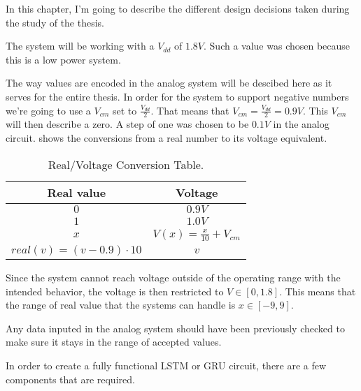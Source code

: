 
\label{cap:design}

In this chapter, I'm going to describe the different design decisions taken during the study of the thesis.

The system will be working with a $V_{dd}$ of $1.8V$. Such a value was chosen because this is a low power system.

The way values are encoded in the analog system will be descibed here as it serves for the entire thesis.
In order for the system to support negative numbers we're going to use a $V_{cm}$ set to $\frac{V_{dd}}{2}$. That means that $V_{cm}=\frac{V_{dd}}{2}=0.9V$. This $V_{cm}$ will then describe a zero. A step of one was chosen to be $0.1V$ in the analog circuit.
 shows the conversions from a real number to its voltage equivalent.

\begin{table}[H]
  \centering
  \begin{tabular}{|c|c|}
    \hline
    \rowcolor{gray}
    Real value & Voltage \\
    \hline
    $0$ & $0.9V$ \\
    \hline
    $1$ & $1.0V$ \\
    \hline
    $x$ & $V(x)=\frac{x}{10}+V_{cm}$\\
    \hline
    $real(v)=(v-0.9)\cdot 10$ & $v$\\
    \hline
  \end{tabular}
  \caption{Real/Voltage Conversion Table.}
  \label{tab:valConv}
\end{table}

Since the system cannot reach voltage outside of the operating range with the intended behavior, the voltage is then restricted to $V\in [0,1.8]$. This means that the range of real value that the systems can handle is $x\in [-9,9]$.

Any data inputed in the analog system should have been previously checked to make sure it stays in the range of accepted values.

In order to create a fully functional \ac{LSTM} or \ac{GRU} circuit, there are a few components that are required.


